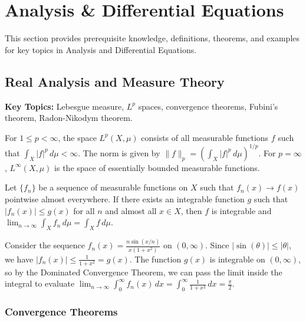 \chapter{Analysis \& Differential Equations}

This section provides prerequisite knowledge, definitions, theorems, and examples for key topics in Analysis and Differential Equations.

\section{Real Analysis and Measure Theory}

\textbf{Key Topics:} Lebesgue measure, $L^p$ spaces, convergence theorems, Fubini's theorem, Radon-Nikodym theorem.

\begin{definition}
For $1 \leq p < \infty$, the space $L^p(X, \mu)$ consists of all measurable functions $f$ such that $\int_X |f|^p \, d\mu < \infty$. The norm is given by $\|f\|_p = \left( \int_X |f|^p \, d\mu \right)^{1/p}$. For $p = \infty$, $L^\infty(X, \mu)$ is the space of essentially bounded measurable functions.
\end{definition}

\begin{theorem}
Let $\{f_n\}$ be a sequence of measurable functions on $X$ such that $f_n(x) \to f(x)$ pointwise almost everywhere. If there exists an integrable function $g$ such that $|f_n(x)| \leq g(x)$ for all $n$ and almost all $x \in X$, then $f$ is integrable and $\lim_{n \to \infty} \int_X f_n \, d\mu = \int_X f \, d\mu$.
\end{theorem}

\begin{example}
Consider the sequence $f_n(x) = \frac{n \sin(x/n)}{x(1+x^2)}$ on $(0, \infty)$. Since $|\sin(\theta)| \leq |\theta|$, we have $|f_n(x)| \leq \frac{1}{1+x^2} = g(x)$. The function $g(x)$ is integrable on $(0, \infty)$, so by the Dominated Convergence Theorem, we can pass the limit inside the integral to evaluate $\lim_{n \to \infty} \int_0^\infty f_n(x) \, dx = \int_0^\infty \frac{1}{1+x^2} \, dx = \frac{\pi}{2}$.
\end{example}

\subsection{Convergence Theorems}


